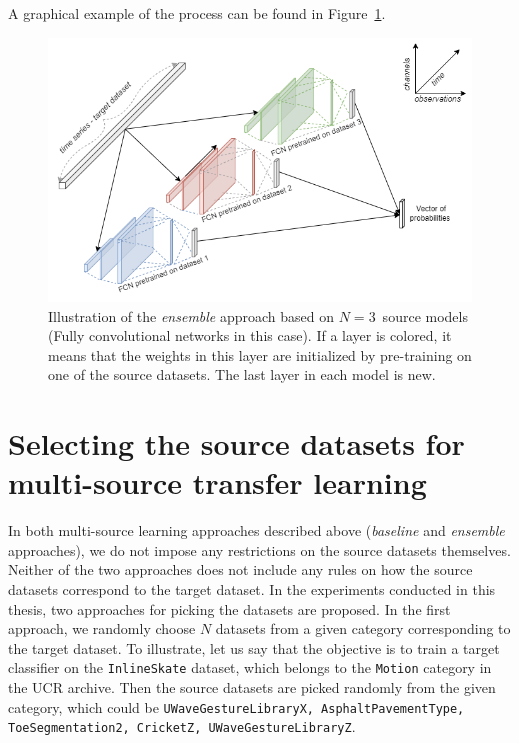 \documentclass[a4paper,11pt,twoside]{report}
\theoremstyle{definition}
\begin{document}
A graphical example of the process can be found in Figure~\ref{fig:ensemble_architecture}.


\FloatBarrier
\begin{figure}[h!]
\centering
\includegraphics[width=17cm]{imgs/ensemble_architecture.png}
\caption{Illustration of the\textit{ ensemble }approach based on $N=3$~source models (Fully convolutional networks in this case). If a layer is colored, it means that the weights in this layer are initialized by pre-training on one of the source datasets. The last layer in each model is new.}
\label{fig:ensemble_architecture}
\end{figure}

\FloatBarrier


\section{Selecting the source datasets for multi-source transfer learning}\label{section:selecting}
In both multi-source learning approaches described above (\textit{baseline} and \textit{ensemble} approaches), we do not impose any restrictions on the source datasets themselves. Neither of the two approaches does not include any rules on how the source datasets correspond to the target dataset. In the experiments conducted in this thesis, two approaches for picking the datasets are proposed. In the first approach, we randomly choose $N$ datasets from a given category corresponding to the target dataset. To illustrate, let us say that the objective is to train a target classifier on the \texttt{InlineSkate} dataset, which belongs to the \texttt{Motion} category in the UCR archive. Then the source datasets are picked randomly from the given category, which could be \texttt{UWaveGestureLibraryX, AsphaltPavementType, ToeSegmentation2, CricketZ, UWaveGestureLibraryZ}.
\end{document}
